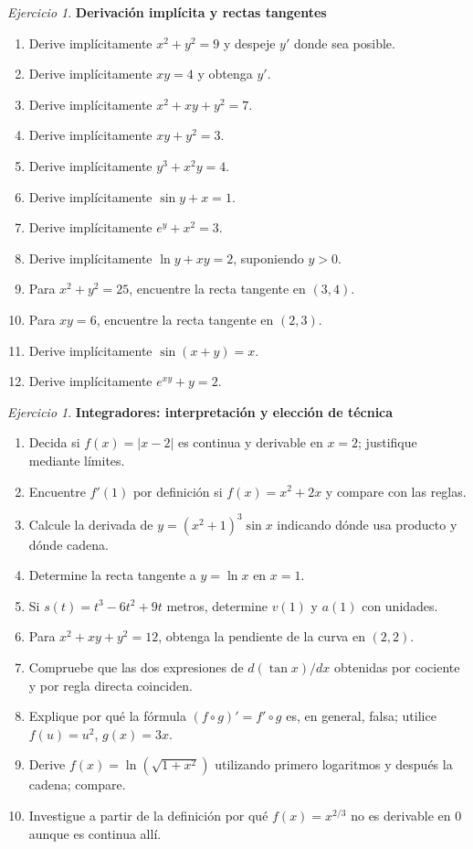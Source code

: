 \documentclass[12pt]{article}
\theoremstyle{remark}
\newtheorem{Ejer}[definicion]{Ejercicio}
\begin{document}
\begin{Ejer}\textbf{Derivación implícita y rectas tangentes}
\begin{enumerate}[resume=banco]
\item Derive implícitamente $x^2+y^2=9$ y despeje $y'$ donde sea posible.
\item Derive implícitamente $xy=4$ y obtenga $y'$.
\item Derive implícitamente $x^2+xy+y^2=7$.
\item Derive implícitamente $xy+y^2=3$.
\item Derive implícitamente $y^3+x^2y=4$.
\item Derive implícitamente $\sin y+x=1$.
\item Derive implícitamente $e^y+x^2=3$.
\item Derive implícitamente $\ln y+xy=2$, suponiendo $y>0$.
\item Para $x^2+y^2=25$, encuentre la recta tangente en $(3,4)$.
\item Para $xy=6$, encuentre la recta tangente en $(2,3)$.
\item Derive implícitamente $\sin(x+y)=x$.
\item Derive implícitamente $e^{xy}+y=2$.
\end{enumerate}
\end{Ejer}

\begin{Ejer}\textbf{Integradores: interpretación y elección de técnica}
\begin{enumerate}[resume=banco]
\item Decida si $f(x)=|x-2|$ es continua y derivable en $x=2$; justifique mediante límites.
\item Encuentre $f'(1)$ por definición si $f(x)=x^2+2x$ y compare con las reglas.
\item Calcule la derivada de $y=(x^2+1)^3\sin x$ indicando dónde usa producto y dónde cadena.
\item Determine la recta tangente a $y=\ln x$ en $x=1$.
\item Si $s(t)=t^3-6t^2+9t$ metros, determine $v(1)$ y $a(1)$ con unidades.
\item Para $x^2+xy+y^2=12$, obtenga la pendiente de la curva en $(2,2)$.
\item Compruebe que las dos expresiones de $d(\tan x)/dx$ obtenidas por cociente y por regla directa coinciden.
\item Explique por qué la fórmula $(f\circ g)'=f'\circ g$ es, en general, falsa; utilice $f(u)=u^2$, $g(x)=3x$.
\item Derive $f(x)=\ln(\sqrt{1+x^2})$ utilizando primero logaritmos y después la cadena; compare.
\item Investigue a partir de la definición por qué $f(x)=x^{2/3}$ no es derivable en $0$ aunque es continua allí.
\end{enumerate}
\end{Ejer}
\end{document}
